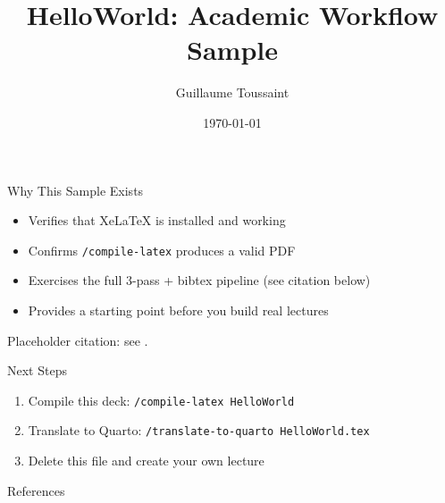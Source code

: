 \documentclass{beamer}
\title{HelloWorld: Academic Workflow Sample}
\author{Guillaume Toussaint}
\institute[Dauphine--PSL]{Université Paris Dauphine--PSL}
\date{\today}
\begin{document}
\frame{\titlepage}

\begin{frame}{Why This Sample Exists}
    \begin{itemize}
        \item Verifies that XeLaTeX is installed and working
        \item Confirms \texttt{/compile-latex} produces a valid PDF
        \item Exercises the full 3-pass + bibtex pipeline (see citation below)
        \item Provides a starting point before you build real lectures
    \end{itemize}
    Placeholder citation: see \cite{Example2024_book}.
\end{frame}

\begin{frame}{Next Steps}
    \begin{enumerate}
        \item Compile this deck: \texttt{/compile-latex HelloWorld}
        \item Translate to Quarto: \texttt{/translate-to-quarto HelloWorld.tex}
        \item Delete this file and create your own lecture
    \end{enumerate}
\end{frame}

\begin{frame}{References}
    
    
\end{frame}
\end{document}
